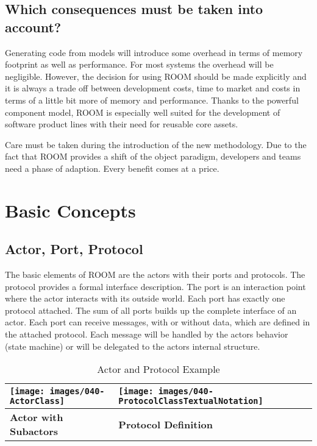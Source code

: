 \subsection{Which consequences must be taken into account?}

Generating code from models will introduce some overhead in terms of memory footprint as well as performance. For most systems the overhead will be negligible. However, the decision for using ROOM should be made explicitly and it is always a trade off between development costs, time to market and costs in terms of a little bit more of memory and performance. Thanks to the powerful component model, ROOM is especially well suited for the development of software product lines with their need for reusable core assets.  
  
Care must be taken during the introduction of the new methodology. Due to the fact that ROOM provides a shift of the object paradigm, developers and teams need a phase of adaption. Every benefit comes at a price.

\section{Basic Concepts}

\subsection{Actor, Port, Protocol}

The basic elements of ROOM are the actors with their ports and protocols. The protocol provides a formal interface description. The port is an interaction point where the actor interacts with its outside world. Each port has exactly one protocol attached. The sum of all ports builds up the complete interface of an actor. Each port can receive messages, with or without data, which are defined in the attached protocol. Each message will be handled by the actors behavior (state machine) or will be delegated to the actors internal structure.

\begin{table}
\caption{Actor and Protocol Example}
\begin{tabular}{|l|l|}
\hline
\texttt{[image: images/040-ActorClass]} & \texttt{[image: images/040-ProtocolClassTextualNotation]} \\ \hline
\textbf{Actor with Subactors} & \textbf{Protocol Definition} \\ \hline
\end{tabular}
\end{table}

